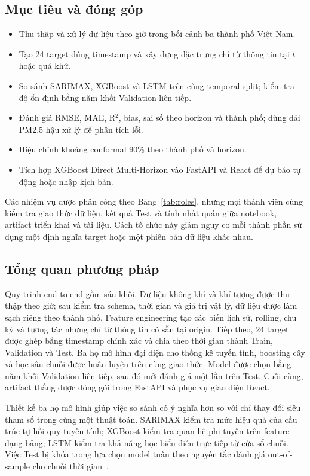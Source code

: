 \documentclass[11pt,a4paper]{article}
\begin{document}
\subsection{Mục tiêu và đóng góp}
\begin{itemize}
\item Thu thập và xử lý dữ liệu theo giờ trong bối cảnh ba thành phố Việt Nam.
\item Tạo 24 target đúng timestamp và xây dựng đặc trưng chỉ từ thông tin tại $t$ hoặc quá khứ.
\item So sánh SARIMAX, XGBoost và LSTM trên cùng temporal split; kiểm tra độ ổn định bằng năm khối Validation liên tiếp.
\item Đánh giá RMSE, MAE, R$^2$, bias, sai số theo horizon và thành phố; dùng dải PM2.5 hậu xử lý để phân tích lỗi.
\item Hiệu chỉnh khoảng conformal 90\% theo thành phố và horizon.
\item Tích hợp XGBoost Direct Multi-Horizon vào FastAPI và React để dự báo tự động hoặc nhập kịch bản.
\end{itemize}

Các nhiệm vụ được phân công theo Bảng~\ref{tab:roles}, nhưng mọi thành viên cùng kiểm tra giao thức dữ liệu, kết quả Test và tính nhất quán giữa notebook, artifact triển khai và tài liệu. Cách tổ chức này giảm nguy cơ mỗi thành phần sử dụng một định nghĩa target hoặc một phiên bản dữ liệu khác nhau.

\subsection{Tổng quan phương pháp}
Quy trình end-to-end gồm sáu khối. Dữ liệu không khí và khí tượng được thu thập theo giờ; sau kiểm tra schema, thời gian và giá trị vật lý, dữ liệu được làm sạch riêng theo thành phố. Feature engineering tạo các biến lịch sử, rolling, chu kỳ và tương tác nhưng chỉ từ thông tin có sẵn tại origin. Tiếp theo, 24 target được ghép bằng timestamp chính xác và chia theo thời gian thành Train, Validation và Test. Ba họ mô hình đại diện cho thống kê tuyến tính, boosting cây và học sâu chuỗi được huấn luyện trên cùng giao thức. Model được chọn bằng năm khối Validation liên tiếp, sau đó mới đánh giá một lần trên Test. Cuối cùng, artifact thắng được đóng gói trong FastAPI và phục vụ giao diện React.

Thiết kế ba họ mô hình giúp việc so sánh có ý nghĩa hơn so với chỉ thay đổi siêu tham số trong cùng một thuật toán. SARIMAX kiểm tra mức hiệu quả của cấu trúc tự hồi quy tuyến tính; XGBoost kiểm tra quan hệ phi tuyến trên feature dạng bảng; LSTM kiểm tra khả năng học biểu diễn trực tiếp từ cửa sổ chuỗi. Việc Test bị khóa trong lựa chọn model tuân theo nguyên tắc đánh giá out-of-sample cho chuỗi thời gian~\cite{tashman}.
\end{document}
